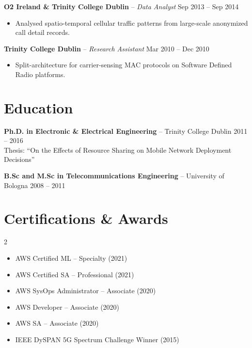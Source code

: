\documentclass[10pt,a4paper]{article}
\begin{document}
\textbf{O2 Ireland \& Trinity College Dublin} -- \textit{Data Analyst} \hfill Sep 2013 -- Sep 2014\\
\vspace{-4pt}
\begin{itemize}[nosep,leftmargin=*,topsep=2pt]
\item Analysed spatio-temporal cellular traffic patterns from large-scale anonymized call detail records.
\end{itemize}

\textbf{Trinity College Dublin} -- \textit{Research Assistant} \hfill Mar 2010 -- Dec 2010\\
\vspace{-4pt}
\begin{itemize}[nosep,leftmargin=*,topsep=2pt]
\item Split-architecture for carrier-sensing MAC protocols on Software Defined Radio platforms.
\end{itemize}

\section{Education}

\textbf{Ph.D. in Electronic \& Electrical Engineering} -- Trinity College Dublin \hfill 2011 -- 2016\\
{\small Thesis: ``On the Effects of Resource Sharing on Mobile Network Deployment Decisions''}

\textbf{B.Sc and M.Sc in Telecommunications Engineering} -- University of Bologna \hfill 2008 -- 2011

\section{Certifications \& Awards}

\vspace{-2pt}
\begin{multicols}{2}
\begin{itemize}[nosep,leftmargin=*]
\item AWS Certified ML -- Specialty (2021)
\item AWS Certified SA -- Professional (2021)
\item AWS SysOps Administrator -- Associate (2020)
\item AWS Developer -- Associate (2020)
\item AWS SA -- Associate (2020)
\item IEEE DySPAN 5G Spectrum Challenge Winner (2015)
\end{itemize}
\end{multicols}
\end{document}
